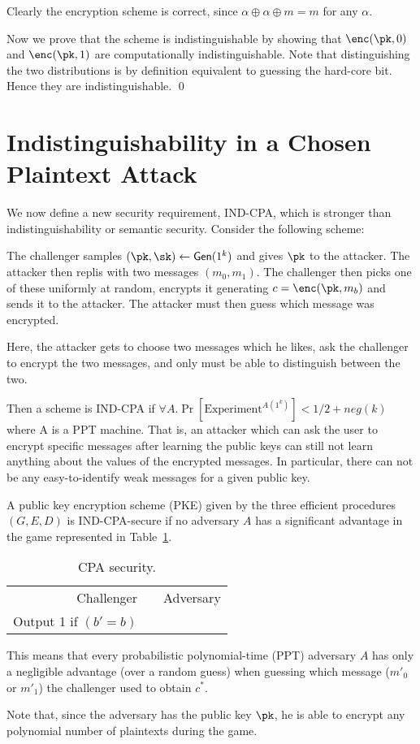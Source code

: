 \proof
Clearly the encryption scheme is correct, since $\alpha \oplus \alpha \oplus m = m$ for any $\alpha$.

Now we  prove  that the scheme is indistinguishable by showing that $\enc(\pk, 0)$ and $\enc(\pk, 1)$
are computationally indistinguishable. Note that distinguishing the two distributions is by definition equivalent to guessing the hard-core bit.
Hence they are indistinguishable.
\qed


\section{Indistinguishability in a Chosen Plaintext Attack}

We now define a new security requirement, IND-CPA, which is stronger than indistinguishability
or semantic security. Consider the following scheme:

The challenger samples $(\pk, \sk) \gets \gen(1^k)$  and gives $\pk$ to the attacker.
The attacker then replis with two messages $(m_0, m_1)$. The challenger then picks
one of these uniformly at random, encrypts it generating $c = \enc(\pk, m_b)$ and sends
it to the attacker. The attacker must then guess which message was encrypted.

Here, the attacker gets to choose two messages which he likes, ask the challenger to
encrypt the two messages, and only must be able to distinguish between the two.

Then a scheme is IND-CPA if $\forall A . \Pr[\text{Experiment}^{A(1^k)}] < 1/2+neg(k)$ where
A is a PPT machine. That is,
an attacker which can ask the user to encrypt specific messages after learning the
public keys can still not learn anything about the values of the encrypted messages. In
particular, there can not be any easy-to-identify weak messages for a given public key.

\begin{definition}
A public key encryption scheme (PKE) given by the three efficient procedures $(G,E,D)$ is
IND-CPA-secure if no adversary $A$ has a significant advantage in the game
represented in Table~\ref{tab:cpa}.
\begin{table}[ht]
\centering
\begin{tabular}{r c l}
Challenger & & Adversary \\
Output 1 if $(b'=b)$ & & \\
\end{tabular}
\caption{CPA security.}\label{tab:cpa}
\end{table}

This means that every probabilistic polynomial-time (PPT) adversary $A$ has only a
negligible advantage (over a random guess)
when guessing which message ($m'_0$ or $m'_1$) the challenger used to
obtain $c^*$.

Note that, since the adversary has the public key $\pk$, he is able to encrypt any
polynomial number of plaintexts during the game.
\end{definition}


